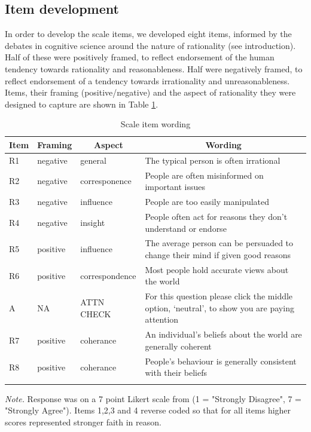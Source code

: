 \documentclass[
  ,jou,floatsintext]{apa6}
\begin{document}
\hypertarget{item-development}{%
\subsection{Item development}\label{item-development}}

In order to develop the scale items, we developed eight items, informed by the debates in cognitive science around the nature of rationality (see introduction). Half of these were positively framed, to reflect endorsement of the human tendency towards rationality and reasonableness. Half were negatively framed, to reflect endorsement of a tendency towards irrationality and unreasonableness. Items, their framing (positive/negative) and the aspect of rationality they were designed to capture are shown in Table \ref{tab:items}.

\begin{table}[tbp]

\begin{center}
\begin{threeparttable}

\caption{\label{tab:items}Scale item wording}

\begin{tabular}{llll}
\toprule
Item & \multicolumn{1}{c}{Framing} & \multicolumn{1}{c}{Aspect} & \multicolumn{1}{c}{Wording}\\
\midrule
R1 & negative & general & The typical person is often irrational\\
R2 & negative & corresponence & People are often misinformed on important issues\\
R3 & negative & influence & People are too easily manipulated\\
R4 & negative & insight & People often act for reasons they don’t understand or endorse\\
R5 & positive & influence & The average person can be persuaded to change their mind if given good reasons\\
R6 & positive & correspondence & Most people hold accurate views about the world\\
A & NA & ATTN CHECK & For this question please click the middle option, ‘neutral’, to show you are paying attention\\
R7 & positive & coherance & An individual's beliefs about the world are generally coherent\\
R8 & positive & coherance & People's behaviour is generally consistent with their beliefs\\
\bottomrule
\addlinespace
\end{tabular}

\begin{tablenotes}[para]
\normalsize{\textit{Note.} Response was on a 7 point Likert scale from (1 = "Strongly Disagree", 7 = "Strongly Agree"). Items 1,2,3 and 4 reverse coded so that for all items higher scores represented stronger faith in reason.}
\end{tablenotes}

\end{threeparttable}
\end{center}

\end{table}
\end{document}
